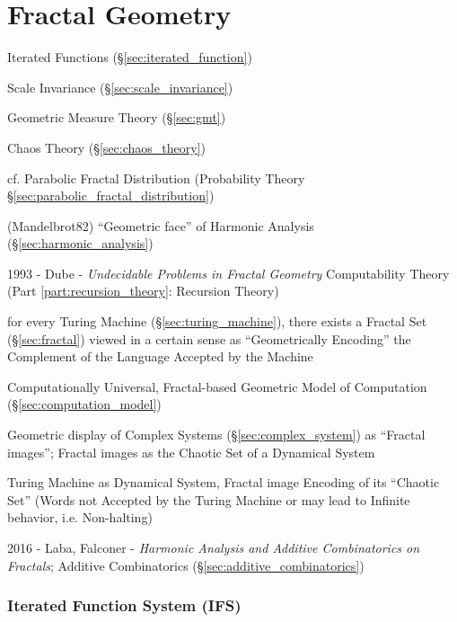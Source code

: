 \part{Fractal Geometry}\label{part:fractal_geometry}

Iterated Functions (\S\ref{sec:iterated_function})

Scale Invariance (\S\ref{sec:scale_invariance})

Geometric Measure Theory (\S\ref{sec:gmt})

Chaos Theory (\S\ref{sec:chaos_theory})

cf. Parabolic Fractal Distribution (Probability Theory
\S\ref{sec:parabolic_fractal_distribution})

(Mandelbrot82) ``Geometric face'' of Harmonic Analysis
(\S\ref{sec:harmonic_analysis})

\asterism

1993 - Dube - \emph{Undecidable Problems in Fractal Geometry} \fist
Computability Theory (Part \ref{part:recursion_theory}: Recursion Theory)

for every Turing Machine (\S\ref{sec:turing_machine}), there exists a Fractal
Set (\S\ref{sec:fractal}) viewed in a certain sense as ``Geometrically
Encoding'' the Complement of the Language Accepted by the Machine

Computationally Universal, Fractal-based Geometric Model of Computation
(\S\ref{sec:computation_model})

Geometric display of Complex Systems (\S\ref{sec:complex_system}) as ``Fractal
images''; Fractal images as the Chaotic Set of a Dynamical System

Turing Machine as Dynamical System, Fractal image Encoding of its ``Chaotic
Set'' (Words not Accepted by the Turing Machine or may lead to Infinite
behavior, i.e. Non-halting)

\asterism

2016 - Laba, Falconer - \emph{Harmonic Analysis and Additive Combinatorics on
  Fractals}; Additive Combinatorics (\S\ref{sec:additive_combinatorics})



\section{Iterated Function System (IFS)}\label{sec:ifs}

